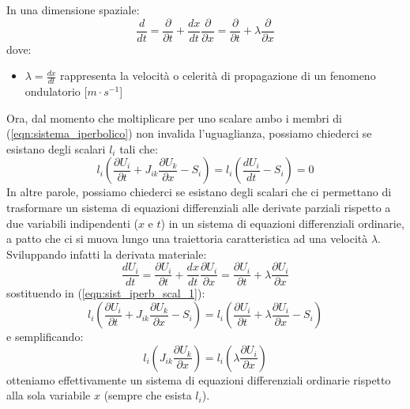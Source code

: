 \documentclass[12pt]{article} %
\begin{document}
\noindent In una dimensione spaziale:
\begin{equation}
    \frac{d}{dt}=\frac{\partial }{\partial t}+\frac{dx}{dt}\frac{\partial }{\partial x}=\frac{\partial }{\partial t}+\lambda\frac{\partial }{\partial x}
    \label{eqn:derivata_materiale_1D}
\end{equation}
\noindent dove:
\begin{itemize}
    \item $\lambda=\frac{dx}{dt}$ rappresenta la velocità o celerità di propagazione di un fenomeno ondulatorio [$m\cdot s^{-1}$]
\end{itemize}
\noindent Ora, dal momento che moltiplicare per uno scalare ambo i membri di (\ref{eqn:sistema_iperbolico}) non invalida l'uguaglianza, possiamo chiederci se esistano degli scalari $l_i$ tali che:
\begin{equation}
    l_i\left(\frac{\partial U_i}{\partial t}+J_{ik}\frac{\partial U_k}{\partial x}-S_i\right)  = l_i\left(\frac{dU_i}{dt}-S_i\right)=0
    \label{eqn:sist_iperb_scal_1}
\end{equation}
\noindent In altre parole, possiamo chiederci se esistano degli scalari che ci permettano di trasformare un sistema di equazioni differenziali alle derivate parziali rispetto a due variabili indipendenti ($x$ e $t$) in un sistema di equazioni differenziali ordinarie, a patto che ci si muova lungo una traiettoria caratteristica ad una velocità $\lambda$.\\
\noindent Sviluppando infatti la derivata materiale:
\begin{equation}
    \frac{dU_i}{dt}=\frac{\partial U_i}{\partial t}+\frac{dx}{dt}\frac{\partial U_i}{\partial x}=\frac{\partial U_i}{\partial t}+\lambda\frac{\partial U_i}{\partial x}
    \label{eqn:derivata_materiale_Ui}
\end{equation}
\noindent sostituendo in (\ref{eqn:sist_iperb_scal_1}):
\begin{equation}
    l_i\left(\frac{\partial U_i}{\partial t}+J_{ik}\frac{\partial U_k}{\partial x}-S_i\right)  = l_i\left(\frac{\partial U_i}{\partial t}+\lambda\frac{\partial U_i}{\partial x}-S_i\right)
    \label{eqn:sist_iperb_scal_2}
\end{equation}
\noindent e semplificando:
\begin{equation}
    l_i\left(J_{ik}\frac{\partial U_k}{\partial x}\right)  = l_i\left(\lambda\frac{\partial U_i}{\partial x}\right)
    \label{eqn:sistema_eq_diff_ord}
\end{equation}
\noindent otteniamo effettivamente un sistema di equazioni differenziali ordinarie rispetto alla sola variabile $x$ (sempre che esista $l_i$).\\
\end{document}

